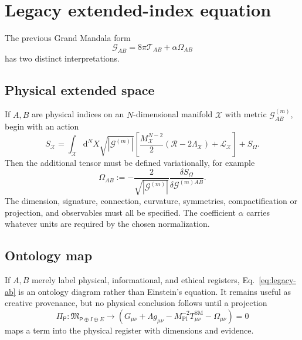 \documentclass[11pt]{article}
\newcommand{\Mpl}{M_{\mathrm{Pl}}}
\newcommand{\Lag}{\mathcal{L}}
\newcommand{\Tsm}{T^{\mathrm{SM}}_{\mu\nu}}
\newcommand{\Om}{\Omega_{\mu\nu}}
\newcommand{\dd}{\mathrm{d}}
\begin{document}
\section{Legacy extended-index equation}

The previous Grand Mandala form
\begin{equation}
\mathcal G_{AB}=8\pi\mathcal T_{AB}+\alpha\Omega_{AB}
\label{eq:legacy-ab}
\end{equation}
has two distinct interpretations.

\subsection{Physical extended space}

If $A,B$ are physical indices on an $N$-dimensional manifold $\mathcal X$ with metric $\mathcal G^{(m)}_{AB}$, begin with an action
\begin{equation}
S_{\mathcal X}=\int_{\mathcal X}\dd^NX\sqrt{|\mathcal G^{(m)}|}
\left[\frac{M_{\mathcal X}^{N-2}}{2}(\mathcal R-2\Lambda_{\mathcal X})
+\Lag_{\mathcal X}\right]+S_\Omega.
\end{equation}
Then the additional tensor must be defined variationally, for example
\begin{equation}
\Omega_{AB}:=-\frac{2}{\sqrt{|\mathcal G^{(m)}|}}
\frac{\delta S_\Omega}{\delta \mathcal G^{(m)AB}}.
\label{eq:omega-ab}
\end{equation}
The dimension, signature, connection, curvature, symmetries, compactification or projection, and observables must all be specified. The coefficient $\alpha$ carries whatever units are required by the chosen normalization.

\subsection{Ontology map}

If $A,B$ merely label physical, informational, and ethical registers, Eq.~\eqref{eq:legacy-ab} is an ontology diagram rather than Einstein's equation. It remains useful as creative provenance, but no physical conclusion follows until a projection
\begin{equation}
\Pi_{\mathsf P}:\mathfrak M_{\mathsf P\oplus I\oplus E}\longrightarrow
\left(G_{\mu\nu}+\Lambda g_{\mu\nu}
-\Mpl^{-2}\Tsm-\Om\right)=0
\label{eq:projection}
\end{equation}
maps a term into the physical register with dimensions and evidence.
\end{document}
